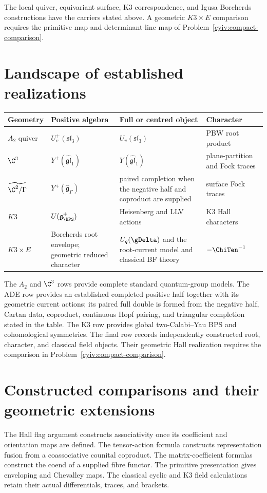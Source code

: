 The local quiver, equivariant surface, K3 correspondence, and Igusa Borcherds constructions have the carriers stated above.
A geometric $K3\times E$ comparison requires the primitive map and determinant-line map of Problem~\ref{cyiv:compact-comparison}.

\chapter{Landscape of established realizations}
\begin{center}
\footnotesize
\begin{tabularx}{0.99\textwidth}{@{}>{\raggedright\arraybackslash}p{}>{\raggedright\arraybackslash}p{}>{\raggedright\arraybackslash}X>{\raggedright\arraybackslash}p{}@{}}
\toprule
\textbf{Geometry}&\textbf{Positive algebra}&\textbf{Full or centred object}&\textbf{Character}\\
\midrule
$A_2$ quiver&$U_v^+(\mathfrak{sl}_3)$&$U_v(\mathfrak{sl}_3)$&PBW root product\\
$\C^3$&$Y^+(\widehat{\mathfrak{gl}}_1)$&$Y(\widehat{\mathfrak{gl}}_1)$&plane-partition and Fock traces\\
$\widetilde{\C^2/\Gamma}$&$Y^+(\widehat{\mathfrak g}_\Gamma)$&paired completion when the negative half and coproduct are supplied&surface Fock traces\\
$K3$&$U(\mathfrak g_{\BPS}^+)$&Heisenberg and LLV actions&K3 Hall characters\\
$K3\times E$&Borcherds root envelope; geometric reduced character&$U_q(\gDelta)$ and the root-current model and classical BF theory&$-\ChiTen^{-1}$\\
\bottomrule
\end{tabularx}
\end{center}
The $A_2$ and $\C^3$ rows provide complete standard quantum-group models. The ADE row provides an established completed positive half together with its geometric current actions; its paired full double is formed from the negative half, Cartan data, coproduct, continuous Hopf pairing, and triangular completion stated in the table. The K3 row provides global two-Calabi--Yau BPS and cohomological symmetries. The final row records independently constructed root, character, and classical field objects.
Their geometric Hall realization requires the comparison in Problem~\ref{cyiv:compact-comparison}.

\chapter{Constructed comparisons and their geometric extensions}
The Hall flag argument constructs associativity once its coefficient
and orientation maps are defined.
The tensor-action formula constructs representation fusion from a
coassociative counital coproduct.
The matrix-coefficient formulas construct the coend of a supplied
fibre functor.
The primitive presentation gives enveloping and Chevalley maps.
The classical cyclic and K3 field calculations retain their actual
differentials, traces, and brackets.

